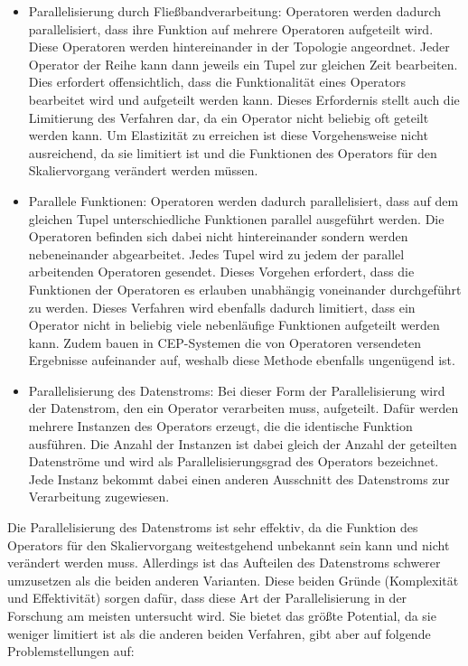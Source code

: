 \begin{itemize}
\item{Parallelisierung durch Fließbandverarbeitung: Operatoren werden dadurch parallelisiert, dass ihre Funktion auf mehrere Operatoren aufgeteilt wird.
Diese Operatoren werden hintereinander in der Topologie angeordnet.
Jeder Operator der Reihe kann dann jeweils ein Tupel zur gleichen Zeit bearbeiten.
Dies erfordert offensichtlich, dass die Funktionalität eines Operators bearbeitet wird und aufgeteilt werden kann.
Dieses Erfordernis stellt auch die Limitierung des Verfahren dar, da ein Operator nicht beliebig oft geteilt werden kann.
Um Elastizität zu erreichen ist diese Vorgehensweise nicht ausreichend, da sie limitiert ist und die Funktionen des Operators für den Skaliervorgang verändert werden müssen.}

\item{Parallele Funktionen: Operatoren werden dadurch parallelisiert, dass auf dem gleichen Tupel unterschiedliche Funktionen parallel ausgeführt werden.
Die Operatoren befinden sich dabei nicht hintereinander sondern werden nebeneinander abgearbeitet.
Jedes Tupel wird zu jedem der parallel arbeitenden Operatoren gesendet.
Dieses Vorgehen erfordert, dass die Funktionen der Operatoren es erlauben unabhängig voneinander durchgeführt zu werden.
Dieses Verfahren wird ebenfalls dadurch limitiert, dass ein Operator nicht in beliebig viele nebenläufige Funktionen aufgeteilt werden kann.
Zudem bauen in CEP-Systemen die von Operatoren versendeten Ergebnisse aufeinander auf, weshalb diese Methode ebenfalls ungenügend ist.}

\item{Parallelisierung des Datenstroms: Bei dieser Form der Parallelisierung wird der Datenstrom, den ein Operator verarbeiten muss, aufgeteilt.
Dafür werden mehrere Instanzen des Operators erzeugt, die die identische Funktion ausführen.
Die Anzahl der Instanzen ist dabei gleich der Anzahl der geteilten Datenströme und wird als Parallelisierungsgrad des Operators bezeichnet.
Jede Instanz bekommt dabei einen anderen Ausschnitt des Datenstroms zur Verarbeitung zugewiesen.}

\end{itemize}

Die Parallelisierung des Datenstroms ist sehr effektiv, da die Funktion des Operators für den Skaliervorgang weitestgehend unbekannt sein kann und nicht verändert werden muss.
Allerdings ist das Aufteilen des Datenstroms schwerer umzusetzen als die beiden anderen Varianten.
Diese beiden Gründe (Komplexität und Effektivität) sorgen dafür, dass diese Art der Parallelisierung in der Forschung am meisten untersucht wird.
Sie bietet das größte Potential, da sie weniger limitiert ist als die anderen beiden Verfahren, gibt aber auf folgende Problemstellungen auf:

